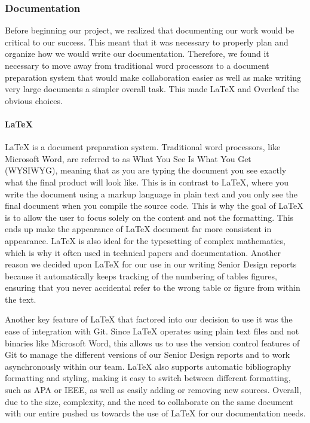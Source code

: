 \subsubsection{Documentation}
Before beginning our project, we realized that documenting our work would be critical to our success. This meant that it was necessary to properly plan and organize how we would write our documentation. Therefore, we found it necessary to move away from traditional word processors to a document preparation system that would make collaboration easier as well as make writing very large documents a simpler overall task. This made LaTeX and Overleaf the obvious choices.

\paragraph{LaTeX}
LaTeX is a document preparation system. Traditional word processors, like Microsoft Word, are referred to as What You See Is What You Get (WYSIWYG), meaning that as you are typing the document you see exactly what the final product will look like. This is in contrast to LaTeX, where you write the document using a markup language in plain text and you only see the final document when you compile the source code. This is why the goal of LaTeX is to allow the user to focus solely on the content and not the formatting. This ends up make the appearance of LaTeX document far more consistent in appearance. LaTeX is also ideal for the typesetting of complex mathematics, which is why it often used in technical papers and documentation. Another reason we decided upon LaTeX for our use in our writing Senior Design reports because it automatically keeps tracking of the numbering of tables figures, ensuring that you never accidental refer to the wrong table or figure from within the text. 

Another key feature of LaTeX that factored into our decision to use it was the ease of integration with Git. Since LaTeX operates using plain text files and not binaries like Microsoft Word, this allows us to use the version control features of Git to manage the different versions of our Senior Design reports and to work asynchronously within our team. LaTeX also supports automatic bibliography formatting and styling, making it easy to switch between different formatting, such as APA or IEEE, as well as easily adding or removing new sources. Overall, due to the size, complexity, and the need to collaborate on the same document with our entire pushed us towards the use of LaTeX for our documentation needs.

